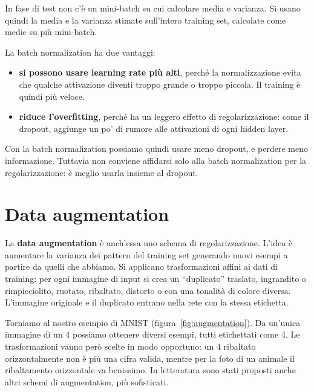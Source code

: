 In fase di test non c'è un mini-batch su cui calcolare media e varianza. Si usano quindi la media e la varianza stimate sull'intero training set, calcolate come medie su più mini-batch.

La batch normalization ha due vantaggi:
\begin{itemize}
    \item \textbf{si possono usare learning rate più alti}, perché la normalizzazione evita che qualche attivazione diventi troppo grande o troppo piccola. Il training è quindi più veloce.
    \item \textbf{riduce l'overfitting}, perché ha un leggero effetto di regolarizzazione: come il dropout, aggiunge un po' di rumore alle attivazioni di ogni hidden layer.
\end{itemize}
Con la batch normalization possiamo quindi usare meno dropout, e perdere meno informazione. Tuttavia non conviene affidarsi solo alla batch normalization per la regolarizzazione: è meglio usarla insieme al dropout.

\section{Data augmentation}
La \textbf{data augmentation} è anch'essa uno schema di regolarizzazione. L'idea è aumentare la varianza dei pattern del training set generando nuovi esempi a partire da quelli che abbiamo. Si applicano trasformazioni affini ai dati di training: per ogni immagine di input si crea un ``duplicato'' traslato, ingrandito o rimpicciolito, ruotato, ribaltato, distorto o con una tonalità di colore diversa. L'immagine originale e il duplicato entrano nella rete con la stessa etichetta.

Torniamo al nostro esempio di MNIST (figura~\ref{fig:augmentation}). Da un'unica immagine di un 4 possiamo ottenere diversi esempi, tutti etichettati come 4. Le trasformazioni vanno però scelte in modo opportuno: un 4 ribaltato orizzontalmente non è più una cifra valida, mentre per la foto di un animale il ribaltamento orizzontale va benissimo. In letteratura sono stati proposti anche altri schemi di augmentation, più sofisticati.

